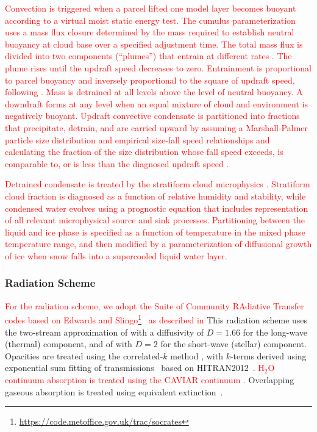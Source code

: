 \documentclass[11pt,numberedappendix,twocolappendix,]{emulateapj}
\def\addYF#1{\textcolor{red}{#1}}
\begin{document}
\addYF{%
Convection is triggered when a parcel lifted one model layer becomes buoyant according to a virtual moist static energy test. 
The cumulus parameterization uses a mass flux closure determined by the mass required to establish neutral buoyancy at cloud base over a specified adjustment time. 
The total mass flux is divided into two components (``plumes'') that entrain at different rates \citep{DelGenio2007}. 
The plume rises until the updraft speed decreases to zero. 
Entrainment is proportional to parcel buoyancy and inversely proportional to the square of updraft speed, following \citet{Gregory2001}. 
Mass is detrained at all levels above the level of neutral buoyancy. 
A downdraft forms at any level when an equal mixture of cloud and environment is negatively buoyant. 
Updraft convective condensate is partitioned into fractions that precipitate, detrain, and are carried upward by assuming a Marshall-Palmer particle size distribution and empirical size-fall speed relationships and calculating the fraction of the size distribution whose fall speed exceeds, is comparable to, or is less than the diagnosed updraft speed \citep{DelGenio2005}. }

\addYF{Detrained condensate is treated by the stratiform cloud microphysics \citep[an updated version of][]{DelGenio1996}. 
Stratiform cloud fraction is diagnosed as a function of relative humidity and stability, while condensed water evolves using a prognostic equation that includes representation of all relevant microphysical source and sink processes.  
Partitioning between the liquid and ice phase is specified as a function of temperature in the mixed phase temperature range, and then modified by a parameterization of diffusional growth of ice when snow falls into a supercooled liquid water layer. }



\subsubsection{Radiation Scheme}

\addYF{For the radiation scheme, we adopt the Suite of Community RAdiative Transfer codes based on Edwards and Slingo\footnote{\url{https://code.metoffice.gov.uk/trac/socrates}}~\citep[SOCRATES,][]{EdwardsSlingo1996,Edwards1996} as described in \citet{Way2017}}
This radiation scheme uses the two-stream approximation of \citet{Zdunkowski1985} with a diffusivity of $D=1.66$ for the long-wave (thermal) component, and of \citet{Zdunkowski1980} with $D=2$ for the short-wave (stellar) component. 
Opacities are treated using the correlated-$k$ method \citep{Lacis1991,Goody1989}, with $k$-terms derived using exponential sum fitting of transmissions~\citep{Wiscombe1977} based on HITRAN2012~\citep{Rothman2013}. 
\addYF{H$_2$O continuum absorption is treated using the CAVIAR continuum \citep{Ptashnik2011}.}
Overlapping gaseous absorption is treated using equivalent extinction~\citep{Edwards1996,Amundsen2016}. 
\end{document}
